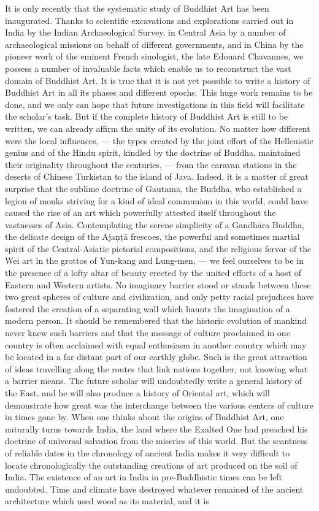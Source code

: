 \documentclass[a4paper, 12pt, oneside]{article}
\begin{document}
It is only recently that the systematic study of Buddhist Art has been inaugurated. Thanks to scientific excavations and explorations carried out in India by the Indian Archaeological Survey, in Central Asia by a number of archaeological missions on behalf of different governments, and in China by the pioneer work of the eminent French sinologist, the late Edouard Chavannes, we possess a number of invaluable facts which enable us to reconstruct the vast domain of Buddhist Art. It is true that it is not yet possible to write a history of Buddhist Art in all its phases and different epochs. This huge work remains to be done, and we only can hope that future investigations in this field will facilitate the scholar's task. But if the complete history of Buddhist Art is still to be written, we can already affirm the unity of its evolution. No matter how different were the local influences, --- the types created by the joint effort of the Hellenistic genius and of the Hindu spirit, kindled by the doctrine of Buddha, maintained their originality throughout the centuries, --- from the caravan stations in the deserts of Chinese Turkistan to the island of Java. Indeed, it is a matter of great surprise that the sublime doctrine of Gautama, the Buddha, who established a legion of monks striving for a kind of ideal communism in this world, could have caused the rise of an art which powerfully attested itself throughout the vastnesses of Asia. Contemplating the serene simplicity of a Gandh\={a}ra Buddha, the delicate design of the Aja\d{n}\d{t}\={a} frescoes, the powerful and sometimes martial spirit of the Central-Asiatic pictorial compositions, and the religious fervor of the Wei art in the grottos of Yun-kang and Lung-men, --- we feel ourselves to be in the presence of a lofty altar of beauty erected by the united efforts of a host of Eastern and Western artists. No imaginary barrier stood or stands between these two great spheres of culture and civilization, and only petty racial prejudices have fostered the creation of a separating wall which haunts the imagination of a modern person. It should be remembered that the historic evolution of mankind never knew such barriers and that the message of culture proclaimed in one country is often acclaimed with equal enthusiasm in another country which may be located in a far distant part of our earthly globe. Such is the great attraction of ideas travelling along the routes that link nations together, not knowing what a barrier means. The future scholar will undoubtedly write a general history of the East, and he will also produce a history of Oriental art, which will demonstrate how great was the interchange between the various centers of culture in times gone by. When one thinks about the origins of Buddhist Art, one naturally turns towards India, the land where the Exalted One had preached his doctrine of universal salvation from the miseries of this world. But the scantness of reliable dates in the chronology of ancient India makes it very difficult to locate chronologically the outstanding creations of art produced on the soil of India. The existence of an art in India in pre-Buddhistic times can be left undoubted. Time and climate have destroyed whatever remained of the ancient architecture which used wood as its material, and it is 
\end{document}
